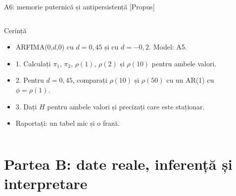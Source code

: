 \begin{frame}{A6: memorie puternică și antipersistență [Propus]}
\propsub
\itemsize{\scriptsize}
\begin{columns}[T]
\begin{column}{\taskw}
\begin{block}{Cerință}
\begin{itemize}
    \item ARFIMA(0,$d$,0) cu $d = 0{,}45$ și cu $d = -0{,}2$. Model: A5.
    \item 1. Calculați $\pi_1$, $\pi_2$, $\rho(1)$, $\rho(2)$ și $\rho(10)$ pentru ambele valori.
    \item 2. Pentru $d = 0{,}45$, comparați $\rho(10)$ și $\rho(50)$ cu un AR(1) cu $\phi = \rho(1)$.
    \item 3. Dați $H$ pentru ambele valori și precizați care este staționar.
    \item Raportați: un tabel mic și o frază.
\end{itemize}
\end{block}
\end{column}
\begin{column}{\solw}
\end{column}
\end{columns}
\end{frame}


\section{Partea B: date reale, inferență și interpretare}

